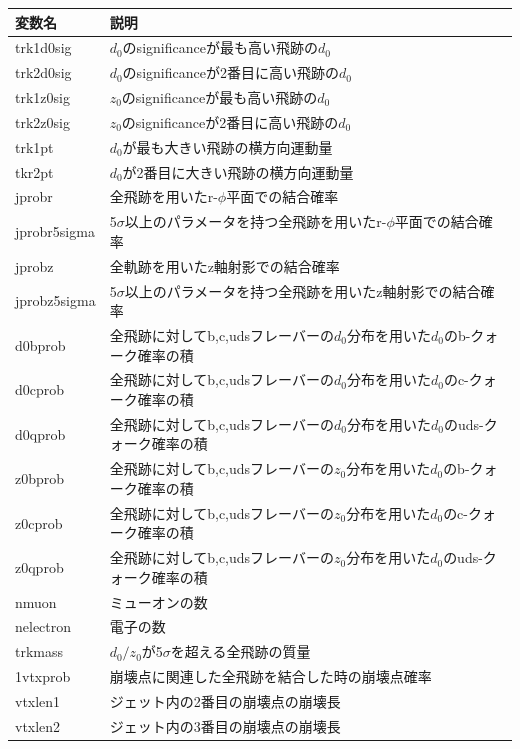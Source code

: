 \begin{table}[H]
 \centering
 \small
  \begin{tabular}{ l | l }
   \hline
   変数名 & 説明\\
   \hline \hline
   trk1d0sig & $d_0$のsignificanceが最も高い飛跡の$d_0$\\
   trk2d0sig & $d_0$のsignificanceが2番目に高い飛跡の$d_0$\\
   trk1z0sig & $z_0$のsignificanceが最も高い飛跡の$d_0$\\
   trk2z0sig & $z_0$のsignificanceが2番目に高い飛跡の$d_0$\\
   trk1pt & $d_0$が最も大きい飛跡の横方向運動量\\
   tkr2pt & $d_0$が2番目に大きい飛跡の横方向運動量\\
   jprobr & 全飛跡を用いたr-$\phi$平面での結合確率\\
   jprobr5sigma & 5$\sigma$以上のパラメータを持つ全飛跡を用いたr-$\phi$平面での結合確率\\
   jprobz & 全軌跡を用いたz軸射影での結合確率\\
   jprobz5sigma & 5$\sigma$以上のパラメータを持つ全飛跡を用いたz軸射影での結合確率\\
   d0bprob & 全飛跡に対してb,c,udsフレーバーの$d_0$分布を用いた$d_0$のb-クォーク確率の積\\
   d0cprob & 全飛跡に対してb,c,udsフレーバーの$d_0$分布を用いた$d_0$のc-クォーク確率の積\\
   d0qprob & 全飛跡に対してb,c,udsフレーバーの$d_0$分布を用いた$d_0$のuds-クォーク確率の積\\
   z0bprob & 全飛跡に対してb,c,udsフレーバーの$z_0$分布を用いた$d_0$のb-クォーク確率の積\\
   z0cprob & 全飛跡に対してb,c,udsフレーバーの$z_0$分布を用いた$d_0$のc-クォーク確率の積\\
   z0qprob & 全飛跡に対してb,c,udsフレーバーの$z_0$分布を用いた$d_0$のuds-クォーク確率の積\\
   nmuon & ミューオンの数\\
   nelectron & 電子の数\\
   trkmass & $d_0/z_0$が5$\sigma$を超える全飛跡の質量\\
   1vtxprob & 崩壊点に関連した全飛跡を結合した時の崩壊点確率\\
   vtxlen1 & ジェット内の2番目の崩壊点の崩壊長\\
   vtxlen2 & ジェット内の3番目の崩壊点の崩壊長\\

\end{tabular}
\end{table}
